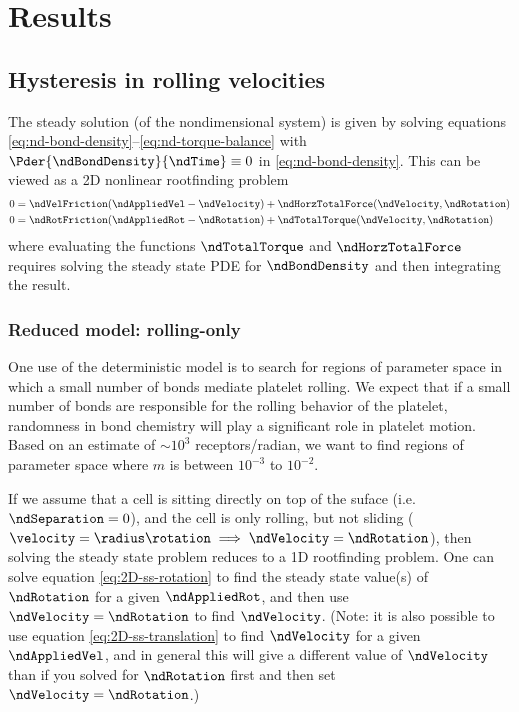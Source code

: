 
\chapter{Results}
\label{cha:results}

\section{Hysteresis in rolling velocities}
\label{sec:hyst-roll-veloc}

The steady solution (of the nondimensional system) is given by solving
equations \eqref{eq:nd-bond-density}--\eqref{eq:nd-torque-balance}
with $\Pder{\ndBondDensity}{\ndTime} \equiv 0$ in
\eqref{eq:nd-bond-density}. This can be viewed as a 2D nonlinear
rootfinding problem
\begin{align}
  \label{eq:2D-ss-translation}
  0 &= \ndVelFriction (\ndAppliedVel - \ndVelocity) +
      \ndHorzTotalForce(\ndVelocity, \ndRotation) \\
  \label{eq:2D-ss-rotation}
  0 &= \ndRotFriction (\ndAppliedRot - \ndRotation) +
      \ndTotalTorque(\ndVelocity, \ndRotation)
\end{align}
where evaluating the functions $\ndTotalTorque$ and
$\ndHorzTotalForce$ requires solving the steady state PDE for
$\ndBondDensity$ and then integrating the result.

\subsection{Reduced model: rolling-only}
\label{sec:reduced-model}

One use of the deterministic model is to search for regions of
parameter space in which a small number of bonds mediate platelet
rolling. We expect that if a small number of bonds are responsible for
the rolling behavior of the platelet, randomness in bond chemistry
will play a significant role in platelet motion. Based on an estimate
of $\sim 10^3$ receptors/radian, we want to find regions of parameter
space where $m$ is between $10^{-3}$ to $10^{-2}$.

If we assume that a cell is sitting directly on top of the suface
(i.e. $\ndSeparation = 0$), and the cell is only rolling, but not
sliding
($\velocity = \radius\rotation \implies \ndVelocity = \ndRotation$),
then solving the steady state problem reduces to a 1D rootfinding
problem. One can solve equation \eqref{eq:2D-ss-rotation} to find the
steady state value(s) of $\ndRotation$ for a given $\ndAppliedRot$,
and then use $\ndVelocity = \ndRotation$ to find $\ndVelocity$. (Note:
it is also possible to use equation \eqref{eq:2D-ss-translation} to
find $\ndVelocity$ for a given $\ndAppliedVel$, and in general this
will give a different value of $\ndVelocity$ than if you solved for
$\ndRotation$ first and then set $\ndVelocity = \ndRotation$.)

